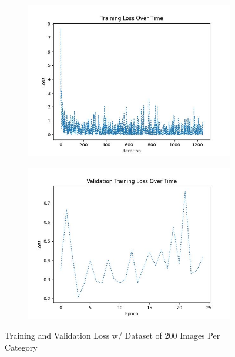 \documentclass{article}
\begin{document}
\begin{figure}[H]
    \centering
    \begin{subfigure}{0.4\textwidth}
        \centering
        \includegraphics[width = \textwidth]{imgs/loss/loss_plot_200.jpg}
    \end{subfigure}
    \begin{subfigure}{0.4\textwidth}
        \centering
        \includegraphics[width = \textwidth]{imgs/loss/validation_loss_plot_200.jpg}
    \end{subfigure}
    \caption{Training and Validation Loss w/ Dataset of 200 Images Per Category}
\end{figure}
\end{document}
